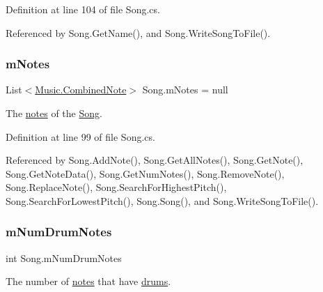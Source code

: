 Definition at line 104 of file Song.\+cs.



Referenced by Song.\+Get\+Name(), and Song.\+Write\+Song\+To\+File().

\mbox{\label{group___song_priv_var_ga674bc904a1f856d485d5fb7fe84bac85}} 
\subsubsection{\texorpdfstring{m\+Notes}{mNotes}}
{\footnotesize\ttfamily List$<$\hyperlink{group___music_structs_struct_music_1_1_combined_note}{Music.\+Combined\+Note}$>$ Song.\+m\+Notes = null\hspace{0.3cm}{\ttfamily [private]}}



The \hyperlink{group___music_structs_struct_music_1_1_combined_note}{notes} of the \hyperlink{class_song}{Song}. 



Definition at line 99 of file Song.\+cs.



Referenced by Song.\+Add\+Note(), Song.\+Get\+All\+Notes(), Song.\+Get\+Note(), Song.\+Get\+Note\+Data(), Song.\+Get\+Num\+Notes(), Song.\+Remove\+Note(), Song.\+Replace\+Note(), Song.\+Search\+For\+Highest\+Pitch(), Song.\+Search\+For\+Lowest\+Pitch(), Song.\+Song(), and Song.\+Write\+Song\+To\+File().

\mbox{\label{group___song_priv_var_ga3dbce17d96b434d4492280c39cff1778}} 
\subsubsection{\texorpdfstring{m\+Num\+Drum\+Notes}{mNumDrumNotes}}
{\footnotesize\ttfamily int Song.\+m\+Num\+Drum\+Notes\hspace{0.3cm}{\ttfamily [private]}}



The number of \hyperlink{group___music_structs_struct_music_1_1_combined_note}{notes} that have \hyperlink{group___music_structs_struct_music_1_1_percussion_note}{drums}. 



